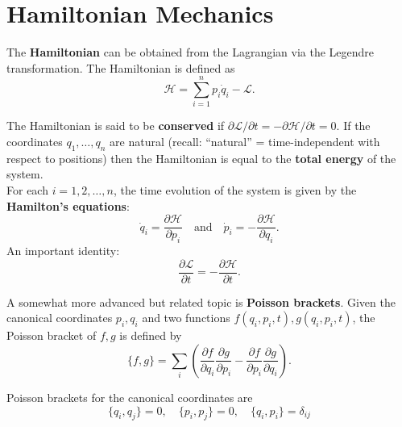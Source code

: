\documentclass{book}
\theoremstyle{definition}
\newcommand{\p}{\partial}
\newcommand{\lag}{\mathcal{L}}
\newcommand{\ham}{\mathcal{H}}
\newcommand{\f}[2]{\frac{#1}{#2}}
\newcommand{\lp}{\left(}
\newcommand{\rp}{\right)}
\begin{document}
\section{Hamiltonian Mechanics}



The \textbf{Hamiltonian} can be obtained from the Lagrangian via the Legendre transformation. The Hamiltonian is defined as
\begin{equation*}
\mathcal{H} = \sum_{i=1}^n p_i  \dot{q}_i - \lag.
\end{equation*}


The Hamiltonian is said to be \textbf{conserved} if $\p \lag/\p t = -\p \ham/\p t = 0$. If the coordinates $q_1,\dots,q_n$ are natural (recall: ``natural'' = time-independent with respect to positions) then the Hamiltonian is equal to the \textbf{total energy} of the system. \\




For each $i = 1,2,\dots, n$, the time evolution of the system is given by the \textbf{Hamilton's equations}:
\begin{equation*}
\dot{q}_i = \f{\p \mathcal{H}}{ \p p_i} \quad \text{and} \quad \dot{p}_i = -\f{\p \ham}{\p q_i}.
\end{equation*}
An important identity:
\begin{equation*}
\f{\p \lag}{\p t} = - \f{\p \ham}{\p t}.
\end{equation*}



A somewhat more advanced but related topic is \textbf{Poisson brackets}. Given the canonical coordinates $p_i,q_i$ and two functions $f(q_i,p_i,t),g(q_i, p_i,t)$, the Poisson bracket of $f,g$ is defined by 
\begin{equation*}
\{ f,g \} = \sum_i \lp \f{\p f}{\p q_i} \f{\p g}{\p p_i} - \f{\p f}{\p p_i} \f{\p g}{\p q_i} \rp.
\end{equation*} 



Poisson brackets for the canonical coordinates are
\begin{equation*}
\{q_i, q_j \} = 0, \quad \{ p_i ,p_j \} = 0, \quad \{ q_i , p_i \} = \delta_{ij}
\end{equation*}
\end{document}
